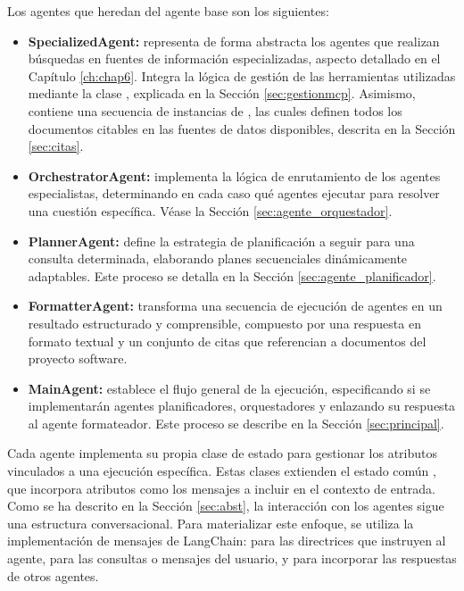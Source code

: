 Los agentes que heredan del agente base son los siguientes:
\begin{itemize}
  \item \textbf{SpecializedAgent:} representa de forma abstracta los agentes que realizan búsquedas en fuentes de información especializadas, aspecto detallado en el Capítulo \ref{ch:chap6}. Integra la lógica de gestión de las herramientas utilizadas mediante la clase , explicada en la Sección \ref{sec:gestionmcp}. Asimismo, contiene una secuencia de instancias de , las cuales definen todos los documentos citables en las fuentes de datos disponibles, descrita en la Sección \ref{sec:citas}.
  \item \textbf{OrchestratorAgent:} implementa la lógica de enrutamiento de los agentes especialistas, determinando en cada caso qué agentes ejecutar para resolver una cuestión específica. Véase la Sección \ref{sec:agente_orquestador}.
  \item \textbf{PlannerAgent:} define la estrategia de planificación a seguir para una consulta determinada, elaborando planes secuenciales dinámicamente adaptables. Este proceso se detalla en la Sección \ref{sec:agente_planificador}.
  \item \textbf{FormatterAgent:} transforma una secuencia de ejecución de agentes en un resultado estructurado y comprensible, compuesto por una respuesta en formato textual y un conjunto de citas que referencian a documentos del proyecto software. 
  \item \textbf{MainAgent:} establece el flujo general de la ejecución, especificando si se implementarán agentes planificadores, orquestadores y enlazando su respuesta al agente formateador. Este proceso se describe en la Sección \ref{sec:principal}.
\end{itemize}

Cada agente implementa su propia clase de estado para gestionar los atributos vinculados a una ejecución específica. Estas clases extienden el estado común , que incorpora atributos como los mensajes a incluir en el contexto de entrada. Como se ha descrito en la Sección \ref{sec:abst}, la interacción con los agentes sigue una estructura conversacional. Para materializar este enfoque, se utiliza la implementación de mensajes de LangChain:  para las directrices que instruyen al agente,  para las consultas o mensajes del usuario, y  para incorporar las respuestas de otros agentes.

